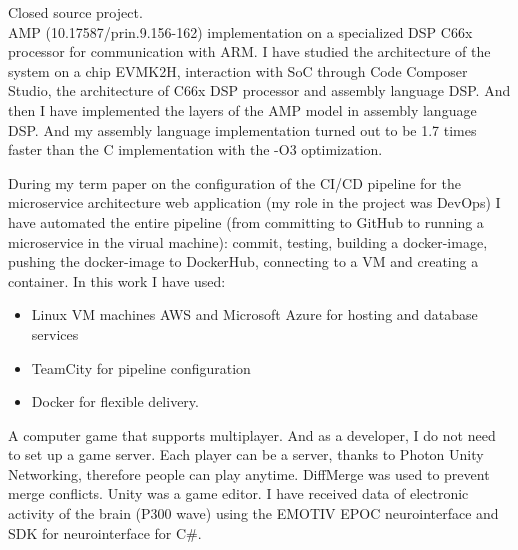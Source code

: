 \documentclass[
	a4paper,
]{fortysecondscv}
\begin{document}


\begin{cvtable}[1.5]
	{Closed source project. }
	{\\ AMP (10.17587/prin.9.156-162) implementation on a specialized DSP C66x processor for communication with ARM. I have studied the architecture of the system on a chip \colorbox{cvsidecolor}{EVMK2H}, interaction with SoC through \colorbox{cvsidecolor}{Code Composer Studio}, the architecture of \colorbox{cvsidecolor}{C66x DSP} processor and \colorbox{cvsidecolor}{assembly language DSP}. And then I have implemented the layers of the AMP model in assembly language DSP. And my assembly language implementation turned out to be 1.7 times faster than the C implementation with the -O3 optimization.}
	{During my term paper on the configuration of the \colorbox{cvsidecolor}{CI/CD} pipeline for the microservice architecture web application (my role in the project was DevOps) I have automated the entire pipeline (from committing to GitHub to running a microservice in the virual machine): commit, testing, building a docker-image, pushing the docker-image to DockerHub, connecting to a VM and creating a container. In this work I have used:
    \begin{itemize}
    \item \colorbox{cvsidecolor}{Linux VM machines} \colorbox{cvsidecolor}{AWS} and \colorbox{cvsidecolor}{Microsoft Azure} for hosting and database services
    \item \colorbox{cvsidecolor}{TeamCity} for pipeline configuration
    \item \colorbox{cvsidecolor}{Docker} for flexible delivery.
    \end{itemize}}
	{A computer game that supports multiplayer. And as a developer, I do not need to set up a game server. Each player can be a server, thanks to \colorbox{cvsidecolor}{Photon Unity Networking}, therefore people can play anytime. \colorbox{cvsidecolor}{DiffMerge} was used to prevent merge conflicts. \colorbox{cvsidecolor}{Unity} was a game editor.}
	{I have received data of electronic activity of the brain (P300 wave) using \colorbox{cvsidecolor}{the EMOTIV EPOC neurointerface} and \colorbox{cvsidecolor}{SDK for neurointerface} for \colorbox{cvsidecolor}{C\#}.}
\end{cvtable}

\cvsignature
\end{document}
